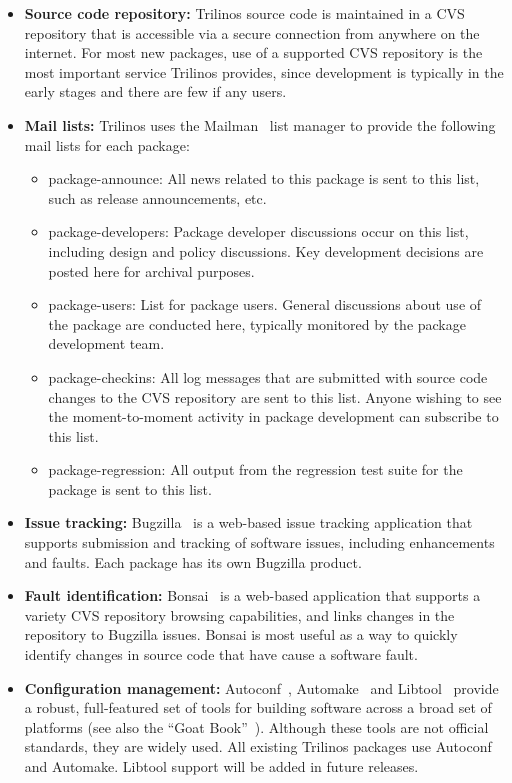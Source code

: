 \documentclass[acmtoms,acmnow]{acmtrans2m}
\begin{document}
\begin{itemize}
\item {\bf Source code repository:}
Trilinos source code is
maintained in a CVS~\cite{CVS} repository that is accessible via a
secure connection from anywhere on the internet.  For most new
packages, use of a supported CVS repository is the most important
service Trilinos provides, since development is typically in the early
stages and there are few if any users.

\item {\bf Mail lists:}
Trilinos uses the Mailman~\cite{Mailman} list manager to provide the
following mail lists for each package:
\begin{itemize}
\item package-announce: All news related to this package is sent to
this list, such as release announcements, etc.
\item package-developers: Package developer discussions occur on this list,
including design and policy discussions.  Key development decisions are posted
here for archival purposes.
\item package-users: List for package users. General discussions about
use of the package are conducted here, typically monitored by the
package development team.
\item package-checkins: All log messages that are submitted with
source code changes to the CVS repository are sent to this list.
Anyone wishing to see the moment-to-moment activity in package
development can subscribe to this list.
\item package-regression: All output from the regression test suite
for the package is sent to this list.
\end{itemize}

\item {\bf Issue tracking:}
Bugzilla~\cite{Bugzilla} is a web-based issue tracking
application that supports submission and tracking of software issues,
including enhancements and faults.  Each package has its own Bugzilla
product.

\item {\bf Fault identification:}
Bonsai~\cite{Bonsai} is a web-based application that supports a
variety CVS repository browsing capabilities, and links changes in the
repository to Bugzilla issues. Bonsai is most useful as a way to
quickly identify changes in source code that have cause a software
fault.

\item {\bf Configuration management:}
Autoconf~\cite{Autoconf},  Automake~\cite{Automake} and
Libtool~\cite{Libtool} provide a robust, full-featured set of tools for
building software across a broad set of platforms (see also the ``Goat
Book''~\cite{GoatBook}).  Although these
tools are not official standards, they are widely used.  All existing
Trilinos packages use Autoconf and Automake.  Libtool support will be
added in future releases. 


\end{itemize}
\end{document}
